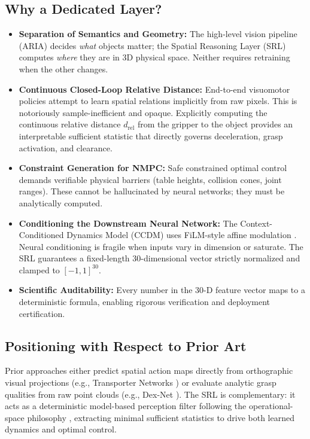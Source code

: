 \documentclass[10pt,a4paper]{article}
\begin{document}
\subsection{Why a Dedicated Layer?}
\begin{itemize}
    \item \textbf{Separation of Semantics and Geometry:} The high-level vision pipeline (ARIA) decides \emph{what} objects matter; the Spatial Reasoning Layer (SRL) computes \emph{where} they are in 3D physical space. Neither requires retraining when the other changes.
    \item \textbf{Continuous Closed-Loop Relative Distance:} End-to-end visuomotor policies \cite{levine2016end, kalashnikov2018qtopt} attempt to learn spatial relations implicitly from raw pixels. This is notoriously sample-inefficient and opaque. Explicitly computing the continuous relative distance $d_{\mathrm{rel}}$ from the gripper to the object provides an interpretable sufficient statistic that directly governs deceleration, grasp activation, and clearance.
    \item \textbf{Constraint Generation for NMPC:} Safe constrained optimal control \cite{mayne2000constrained} demands verifiable physical barriers (table heights, collision cones, joint ranges). These cannot be hallucinated by neural networks; they must be analytically computed.
    \item \textbf{Conditioning the Downstream Neural Network:} The Context-Conditioned Dynamics Model (CCDM) uses FiLM-style affine modulation \cite{perez2018film}. Neural conditioning is fragile when inputs vary in dimension or saturate. The SRL guarantees a fixed-length 30-dimensional vector strictly normalized and clamped to $[-1, 1]^{30}$.
    \item \textbf{Scientific Auditability:} Every number in the 30-D feature vector maps to a deterministic formula, enabling rigorous verification and deployment certification.
\end{itemize}

\subsection{Positioning with Respect to Prior Art}
Prior approaches either predict spatial action maps directly from orthographic visual projections (e.g., Transporter Networks \cite{zeng2020transporter}) or evaluate analytic grasp qualities from raw point clouds (e.g., Dex-Net \cite{mahler2017dexnet}). The SRL is complementary: it acts as a deterministic model-based perception filter following the operational-space philosophy \cite{khatib1987unified}, extracting minimal sufficient statistics to drive both learned dynamics and optimal control.
\end{document}
